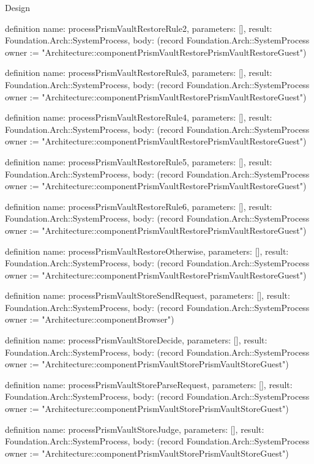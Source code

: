 \begin{lexlean}{Design}
\begin{semanticmodule}
definition{
  name: processPrismVaultRestoreRule2,
  parameters: [],
  result: Foundation.Arch::SystemProcess,
  body: (record Foundation.Arch::SystemProcess {owner := "Architecture::componentPrismVaultRestorePrismVaultRestoreGuest"})
}

definition{
  name: processPrismVaultRestoreRule3,
  parameters: [],
  result: Foundation.Arch::SystemProcess,
  body: (record Foundation.Arch::SystemProcess {owner := "Architecture::componentPrismVaultRestorePrismVaultRestoreGuest"})
}

definition{
  name: processPrismVaultRestoreRule4,
  parameters: [],
  result: Foundation.Arch::SystemProcess,
  body: (record Foundation.Arch::SystemProcess {owner := "Architecture::componentPrismVaultRestorePrismVaultRestoreGuest"})
}

definition{
  name: processPrismVaultRestoreRule5,
  parameters: [],
  result: Foundation.Arch::SystemProcess,
  body: (record Foundation.Arch::SystemProcess {owner := "Architecture::componentPrismVaultRestorePrismVaultRestoreGuest"})
}

definition{
  name: processPrismVaultRestoreRule6,
  parameters: [],
  result: Foundation.Arch::SystemProcess,
  body: (record Foundation.Arch::SystemProcess {owner := "Architecture::componentPrismVaultRestorePrismVaultRestoreGuest"})
}

definition{
  name: processPrismVaultRestoreOtherwise,
  parameters: [],
  result: Foundation.Arch::SystemProcess,
  body: (record Foundation.Arch::SystemProcess {owner := "Architecture::componentPrismVaultRestorePrismVaultRestoreGuest"})
}

definition{
  name: processPrismVaultStoreSendRequest,
  parameters: [],
  result: Foundation.Arch::SystemProcess,
  body: (record Foundation.Arch::SystemProcess {owner := "Architecture::componentBrowser"})
}

definition{
  name: processPrismVaultStoreDecide,
  parameters: [],
  result: Foundation.Arch::SystemProcess,
  body: (record Foundation.Arch::SystemProcess {owner := "Architecture::componentPrismVaultStorePrismVaultStoreGuest"})
}

definition{
  name: processPrismVaultStoreParseRequest,
  parameters: [],
  result: Foundation.Arch::SystemProcess,
  body: (record Foundation.Arch::SystemProcess {owner := "Architecture::componentPrismVaultStorePrismVaultStoreGuest"})
}

definition{
  name: processPrismVaultStoreJudge,
  parameters: [],
  result: Foundation.Arch::SystemProcess,
  body: (record Foundation.Arch::SystemProcess {owner := "Architecture::componentPrismVaultStorePrismVaultStoreGuest"})
}


\end{semanticmodule}
\end{lexlean}
